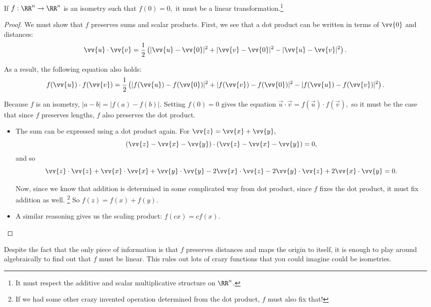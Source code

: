 \begin{lemma}
If $f: \RR^n \rightarrow \RR^n$ is an isometry such that $f(0) = 0,$ it must be a linear transformation.\footnote{It must respect the additive and scalar multiplicative structure on $\RR^n$.} 
\end{lemma}

\begin{proof}

We must show that $f$ preserves sums and scalar products. First, we see that a dot product can be written in terms of $\vv{0}$ and distances:
    \[
    \vv{u} \cdot \vv{v} = \frac{1}{2}\left(|\vv{u} - \vv{0}|^2 + |\vv{v} - \vv{0}|^2 - |\vv{u}-\vv{v}|^2\right).
    \]
    
As a result, the following equation also holds:
    \[
    f(\vv{u}) \cdot f(\vv{v}) = \frac{1}{2}\left(|f(\vv{u}) - f(\vv{0})|^2 + |f(\vv{v}) - f(\vv{0})|^2 - |f(\vv{u})-f(\vv{v})|^2\right).
    \]
    
    Because $f$ is an isometry, $|a-b| = |f(a)-f(b)|$. Setting $f(0) = 0$ gives the equation $\vec{u} \cdot \vec{v} = f(\vec{u}) \cdot f(\vec{v}),$ so it must be the case that since $f$ preserves lengths, $f$ also preserves the dot product.
\begin{itemize}
    \item The sum can be expressed using a dot product again. For $\vv{z} = \vv{x} + \vv{y},$ 
    \[
    (\vv{z} - \vv{x}-\vv{y}) \cdot (\vv{z} - \vv{x}-\vv{y}) = 0,
    \]
    and so 
    \[
    \vv{z} \cdot \vv{z} + \vv{x} \cdot \vv{x} + \vv{y}\cdot\vv{y} - 2\vv{x}\cdot\vv{z} - 2\vv{y}\cdot \vv{z} + 2\vv{x}\cdot\vv{y} = 0.
    \]
    
    Now, since we know that addition is determined in some complicated way from dot product, since $f$ fixes the dot product, it must fix addition as well. \footnote{If we had some other crazy invented operation determined from the dot product, $f$ must also fix that!}
    So $f(z) = f(x) + f(y).$
    
    \item A similar reasoning gives us the scaling product: $f(cx) = cf(x).$
\end{itemize}

\end{proof}

Despite the fact that the only piece of information is that $f$ preserves distances and maps the origin to itself, it is enough to play around algebraically to find out that $f$ must be linear. This rules out lots of crazy functions that you could imagine could be isometries. 


